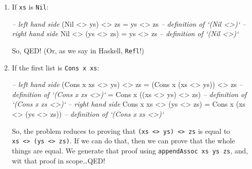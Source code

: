 \documentclass[]{article}
\newenvironment{Shaded}{}{}
\newcommand{\DataTypeTok}[1]{\textcolor[rgb]{0.56,0.13,0.00}{{#1}}}
\newcommand{\CommentTok}[1]{\textcolor[rgb]{0.38,0.63,0.69}{\textit{{#1}}}}
\newcommand{\FunctionTok}[1]{\textcolor[rgb]{0.02,0.16,0.49}{{#1}}}
\newcommand{\NormalTok}[1]{{#1}}
\begin{document}
\begin{enumerate}
\def\labelenumi{\arabic{enumi}.}
\item
  If \texttt{xs} is \texttt{Nil}:

\begin{Shaded}
\begin{Highlighting}[]
\CommentTok{-- left hand side}
\NormalTok{(}\DataTypeTok{Nil} \FunctionTok{<>} \NormalTok{ys) }\FunctionTok{<>} \NormalTok{zs}
  \FunctionTok{=} \NormalTok{ys }\FunctionTok{<>} \NormalTok{zs        }\CommentTok{-- definition of `(Nil <>)`}
\CommentTok{-- right hand side}
\DataTypeTok{Nil} \FunctionTok{<>} \NormalTok{(ys }\FunctionTok{<>} \NormalTok{zs)}
  \FunctionTok{=} \NormalTok{ys }\FunctionTok{<>} \NormalTok{zs        }\CommentTok{-- definition of `(Nil <>)`}
\end{Highlighting}
\end{Shaded}

  So, QED! (Or, as we say in Haskell, \texttt{Refl}!)
\item
  If the first list is \texttt{Cons\ x\ xs}:

\begin{Shaded}
\begin{Highlighting}[]
\CommentTok{-- left hand side}
\NormalTok{(}\DataTypeTok{Cons} \NormalTok{x xs }\FunctionTok{<>} \NormalTok{ys) }\FunctionTok{<>} \NormalTok{zs}
  \FunctionTok{=} \NormalTok{(}\DataTypeTok{Cons} \NormalTok{x (xs }\FunctionTok{<>} \NormalTok{ys)) }\FunctionTok{<>} \NormalTok{zs   }\CommentTok{-- definition of `(Cons x xs <>)`}
  \FunctionTok{=} \DataTypeTok{Cons} \NormalTok{x ((xs }\FunctionTok{<>} \NormalTok{ys) }\FunctionTok{<>} \NormalTok{zs)   }\CommentTok{-- definition of `(Cons x xs <>)`}
\CommentTok{-- right hand side}
\DataTypeTok{Cons} \NormalTok{x xs }\FunctionTok{<>} \NormalTok{(ys }\FunctionTok{<>} \NormalTok{zs)}
  \FunctionTok{=} \DataTypeTok{Cons} \NormalTok{x (xs }\FunctionTok{<>} \NormalTok{(ys }\FunctionTok{<>} \NormalTok{zs))   }\CommentTok{-- definition of `(Cons x xs <>)`}
\end{Highlighting}
\end{Shaded}

  So, the problem reduces to proving that
  \texttt{(xs\ \textless{}\textgreater{}\ ys)\ \textless{}\textgreater{}\ zs} is
  equal to
  \texttt{xs\ \textless{}\textgreater{}\ (ys\ \textless{}\textgreater{}\ zs)}.
  If we can do that, then we can prove that the whole things are equal. We
  generate that proof using \texttt{appendAssoc\ xs\ ys\ zs}, and, wit that
  proof in scope\ldots{}QED!
\end{enumerate}
\end{document}
